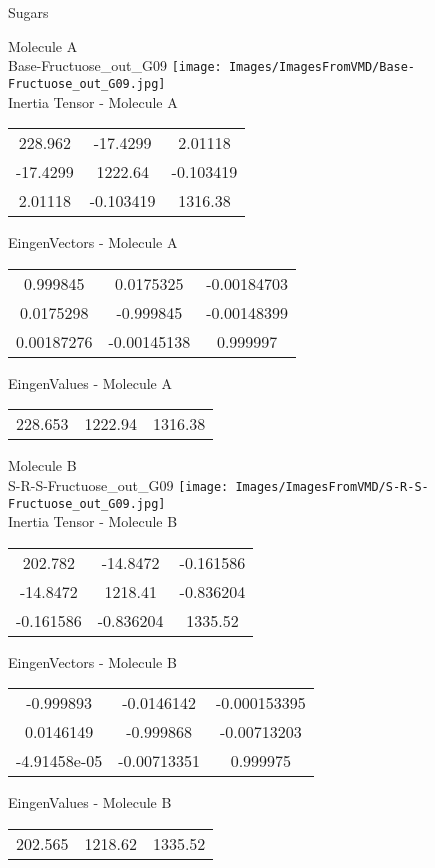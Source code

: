 \vtab[-2cm]
\begin{center}
{\large Sugars}
\end{center}
\begin{multicols}{2}
\begin{center}
Molecule A \\ 
Base-Fructuose\_out\_G09
\texttt{[image: Images/ImagesFromVMD/Base-Fructuose\_out\_G09.jpg]}
\\
Inertia Tensor - Molecule A \\
\vtab
\begin{tabular}{|c c c|}
228.962	 & 	-17.4299	 & 	2.01118	 \\
-17.4299	 & 	1222.64	 & 	-0.103419	 \\
2.01118	 & 	-0.103419	 & 	1316.38
\end{tabular}

\vtab
 EingenVectors - Molecule A     \\
\vtab
\begin{tabular}{|c c c|}
0.999845	 & 	0.0175325	 & 	-0.00184703	 \\
0.0175298	 & 	-0.999845	 & 	-0.00148399	 \\
0.00187276	 & 	-0.00145138	 & 	0.999997
\end{tabular}

\vtab
 EingenValues - Molecule A     \\
\vtab
\begin{tabular}{|c c c|}
228.653	 & 	1222.94	 & 	1316.38
\end{tabular}
\columnbreak

Molecule B \\ 
S-R-S-Fructuose\_out\_G09
\texttt{[image: Images/ImagesFromVMD/S-R-S-Fructuose\_out\_G09.jpg]}
\\
Inertia Tensor - Molecule B \\
\vtab
\begin{tabular}{|c c c|}
202.782	 & 	-14.8472	 & 	-0.161586	 \\
-14.8472	 & 	1218.41	 & 	-0.836204	 \\
-0.161586	 & 	-0.836204	 & 	1335.52
\end{tabular}

\vtab
 EingenVectors - Molecule B     \\
\vtab
\begin{tabular}{|c c c|}
-0.999893	 & 	-0.0146142	 & 	-0.000153395	 \\
0.0146149	 & 	-0.999868	 & 	-0.00713203	 \\
-4.91458e-05	 & 	-0.00713351	 & 	0.999975
\end{tabular}

\vtab
 EingenValues - Molecule B     \\
\vtab
\begin{tabular}{|c c c|}
202.565	 & 	1218.62	 & 	1335.52
\end{tabular}

\end{center}
\end{multicols}

